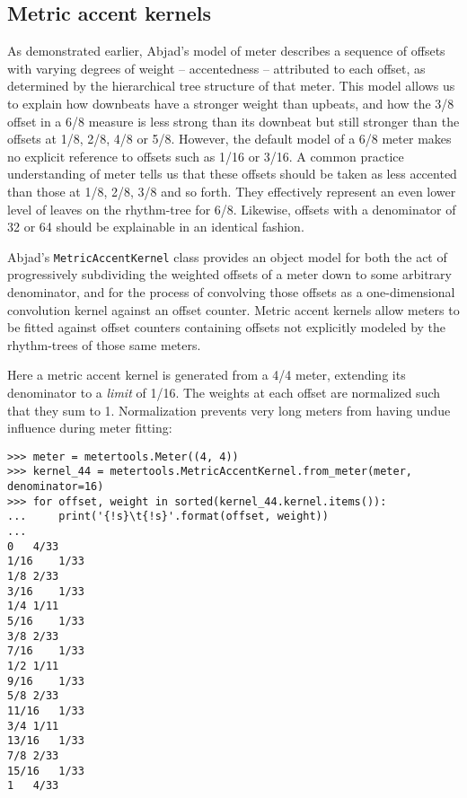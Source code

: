\subsection{Metric accent kernels} %

As demonstrated earlier, Abjad's model of meter describes a sequence of offsets
with varying degrees of weight -- accentedness -- attributed to each offset, as
determined by the hierarchical tree structure of that meter. This model allows
us to explain how downbeats have a stronger weight than upbeats, and how the
3/8 offset in a 6/8 measure is less strong than its downbeat but still stronger
than the offsets at 1/8, 2/8, 4/8 or 5/8. However, the default model of a 6/8
meter makes no explicit reference to offsets such as 1/16 or 3/16. A common
practice understanding of meter tells us that these offsets should be taken as
less accented than those at 1/8, 2/8, 3/8 and so forth. They effectively
represent an even lower level of leaves on the rhythm-tree for 6/8. Likewise,
offsets with a denominator of 32 or 64 should be explainable in an identical
fashion.

Abjad's \texttt{MetricAccentKernel} class provides an object model for both the
act of progressively subdividing the weighted offsets of a meter down to some
arbitrary denominator, and for the process of convolving those offsets as a
one-dimensional convolution kernel against an offset counter. Metric accent
kernels allow meters to be fitted against offset counters containing offsets
not explicitly modeled by the rhythm-trees of those same meters.

Here a metric accent kernel is generated from a 4/4 meter, extending its
denominator to a \emph{limit} of 1/16. The weights at each offset are
normalized such that they sum to 1. Normalization prevents very long meters
from having undue influence during meter fitting:

\begin{comment}
<abjad>
meter = metertools.Meter((4, 4))
kernel_44 = metertools.MetricAccentKernel.from_meter(meter, denominator=16)
for offset, weight in sorted(kernel_44.kernel.items()):
    print('{!s}\t{!s}'.format(offset, weight))

</abjad>
\end{comment}

\begin{singlespacing}
\vspace{-0.5\baselineskip}
\begin{lstlisting}
>>> meter = metertools.Meter((4, 4))
>>> kernel_44 = metertools.MetricAccentKernel.from_meter(meter, denominator=16)
>>> for offset, weight in sorted(kernel_44.kernel.items()):
...     print('{!s}\t{!s}'.format(offset, weight))
...
0	4/33
1/16	1/33
1/8	2/33
3/16	1/33
1/4	1/11
5/16	1/33
3/8	2/33
7/16	1/33
1/2	1/11
9/16	1/33
5/8	2/33
11/16	1/33
3/4	1/11
13/16	1/33
7/8	2/33
15/16	1/33
1	4/33
\end{lstlisting}
\end{singlespacing}

